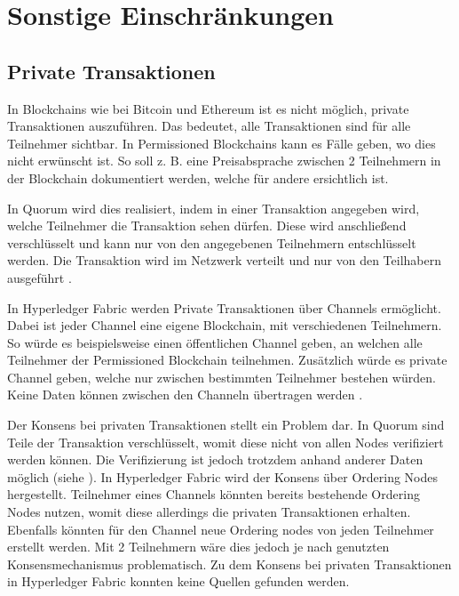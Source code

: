 \section{Sonstige Einschränkungen}

\subsection{Private Transaktionen}
In Blockchains wie bei Bitcoin und Ethereum ist es nicht möglich, private Transaktionen auszuführen. Das bedeutet, alle Transaktionen sind für alle Teilnehmer sichtbar. In Permissioned Blockchains kann es Fälle geben, wo dies nicht erwünscht ist. So soll z. B. eine Preisabsprache zwischen 2 Teilnehmern in der Blockchain dokumentiert werden, welche für andere ersichtlich ist.

In Quorum wird dies realisiert, indem in einer Transaktion angegeben wird, welche Teilnehmer die Transaktion sehen dürfen. Diese wird anschließend verschlüsselt und kann nur von den angegebenen Teilnehmern entschlüsselt werden. Die Transaktion wird im Netzwerk verteilt und nur von den Teilhabern ausgeführt \cite{QuorumTeamTransactionProcessingQuorum2018}.

In Hyperledger Fabric werden Private Transaktionen über Channels ermöglicht. Dabei ist jeder Channel eine eigene Blockchain, mit verschiedenen Teilnehmern. So würde es beispielsweise einen öffentlichen Channel geben, an welchen alle Teilnehmer der Permissioned Blockchain teilnehmen. Zusätzlich würde es private Channel geben, welche nur zwischen bestimmten Teilnehmer bestehen würden. Keine Daten können zwischen den Channeln übertragen werden \cite{SchererPerformanceScalabilityBlockchain2017}. 

Der Konsens bei privaten Transaktionen stellt ein Problem dar. In Quorum sind Teile der Transaktion verschlüsselt, womit diese nicht von allen Nodes verifiziert werden können. Die Verifizierung ist jedoch trotzdem anhand anderer Daten möglich (siehe \cite{QuorumTeamQuorumChainConsensus2018}). In Hyperledger Fabric wird der Konsens über Ordering Nodes hergestellt. Teilnehmer eines Channels könnten bereits bestehende Ordering Nodes nutzen, womit diese allerdings die privaten Transaktionen erhalten. Ebenfalls könnten für den Channel neue Ordering nodes von jeden Teilnehmer erstellt werden. Mit 2 Teilnehmern wäre dies jedoch je nach genutzten Konsensmechanismus problematisch. Zu dem Konsens bei privaten Transaktionen in Hyperledger Fabric konnten keine Quellen gefunden werden.

